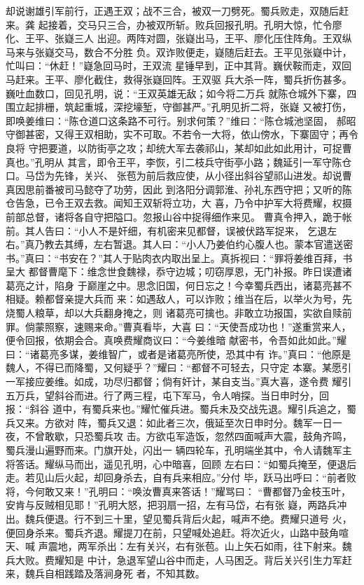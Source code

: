 却说谢雄引军前行，正遇王双；战不三合，被双一刀劈死。蜀兵败走，双随后赶来。龚
起接着，交马只三合，办被双所斩。败兵回报孔明。孔明大惊，忙令廖化、王平、张嶷三人
出迎。两阵对圆，张嶷出马，王平、廖化压住阵角。王双纵马来与张嶷交马，数合不分胜
负。双诈败便走，嶷随后赶去。王平见张嶷中计，忙叫曰：“休赶！”嶷急回马时，王双流
星锤早到，正中其背。巍伏鞍而走，双回马赶来。王平、廖化截住，救得张嶷回阵。王双驱
兵大杀一阵，蜀兵折伤甚多。巍吐血数口，回见孔明，说：“王双英雄无敌；如今将二万兵
就陈仓城外下寨，四围立起排栅，筑起重城，深挖壕堑，守御甚严。”孔明见折二将，张嶷
又被打伤，即唤姜维曰：“陈仓道口这条路不可行。别求何策？”维曰：“陈仓城池坚固，
郝昭守御甚密，又得王双相助，实不可取。不若令一大将，依山傍水，下寨固守；再令良将
守把要道，以防街亭之攻；却统大军去袭祁山，某却如此如此用计，可捉曹真也。”孔明从
其言，即令王平，李恢，引二枝兵守街亭小路；魏延引一军守陈仓口。马岱为先锋，关兴、
张苞为前后救应使，从小径出斜谷望祁山进发。却说曹真因思前番被司马懿夺了功劳，因此
到洛阳分调郭淮、孙礼东西守把；又听的陈仓告急，已令王双去救。闻知王双斩将立功，大
喜，乃令中护军大将费耀，权摄前部总督，诸将各自守把隘口。忽报山谷中捉得细作来见。
曹真令押入，跪于帐前。其人告曰：“小人不是奸细，有机密来见都督，误被伏路军捉来，
乞退左右。”真乃教去其缚，左右暂退。其人曰：“小人乃姜伯约心腹人也。蒙本官遣送密
书。”真曰：“书安在？”其人于贴肉衣内取出呈上。真拆视曰：“罪将姜维百拜，书呈大
都督曹麾下：维念世食魏禄，忝守边城；叨窃厚恩，无门补报。昨日误遭诸葛亮之计，陷身
于巅崖之中。思念旧国，何日忘之！今幸蜀兵西出，诸葛亮甚不相疑。赖都督亲提大兵而
来：如遇敌人，可以诈败；维当在后，以举火为号，先烧蜀人粮草，却以大兵翻身掩之，则
诸葛亮可擒也。非敢立功报国，实欲自赎前罪。倘蒙照察，速赐来命。”曹真看毕，大喜
曰：“天使吾成功也！”遂重赏来人，便令回报，依期会合。真唤费耀商议曰：“今姜维暗
献密书，令吾如此如此。”耀曰：“诸葛亮多谋，姜维智广，或者是诸葛亮所使，恐其中有
诈。”真曰：“他原是魏人，不得已而降蜀，又何疑乎？”耀曰：“都督不可轻去，只守定
本寨。某愿引一军接应姜维。如成，功尽归都督；倘有奸计，某自支当。”真大喜，遂令费
耀引五万兵，望斜谷而进。行了两三程，屯下军马，令人哨探。当日申时分，回报：“斜谷
道中，有蜀兵来也。”耀忙催兵进。蜀兵未及交战先退。耀引兵追之，蜀兵又来。方欲对
阵，蜀兵又退：如此者三次，俄延至次日申时分。魏军一日一夜，不曾敢歇，只恐蜀兵攻
击。方欲屯军造饭，忽然四面喊声大震，鼓角齐鸣，蜀兵漫山遍野而来。门旗开处，闪出一
辆四轮车，孔明端坐其中，令人请魏军主将答话。耀纵马而出，遥见孔明，心中暗喜，回顾
左右曰：“如蜀兵掩至，便退后走。若见山后火起，却回身杀去，自有兵来相应。”分付
毕，跃马出呼曰：“前者败将，今何敢又来！”孔明曰：“唤汝曹真来答话！”耀骂曰：
“曹都督乃金枝玉叶，安肯与反贼相见耶！”孔明大怒，把羽扇一招，左有马岱，右有张
嶷，两路兵冲出。魏兵便退。行不到三十里，望见蜀兵背后火起，喊声不绝。费耀只道号
火，便回身杀来。蜀兵齐退。耀提刀在前，只望喊处追赶。将次近火，山路中鼓角喧天、喊
声震地，两军杀出：左有关兴，右有张苞。山上矢石如雨，往下射来。魏兵大败。费耀知是
中计，急退军望山谷中而走，人马困乏。背后关兴引生力军赶来，魏兵自相践踏及落涧身死
者，不知其数。

